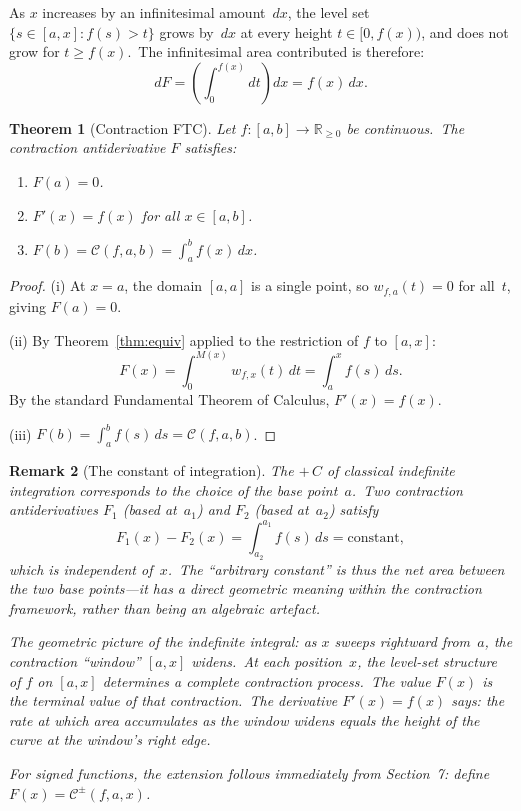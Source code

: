 \documentclass[11pt,a4paper]{article}
\newtheorem{theorem}{Theorem}[section]
\newtheorem{remark}[theorem]{Remark}
\begin{document}
As $x$ increases by an infinitesimal amount~$dx$, the level set $\{s\in[a,x]:f(s)>t\}$ grows by~$dx$ at every height $t\in[0,f(x))$, and does not grow for $t\geq f(x)$.\ The infinitesimal area contributed is therefore:
\[
dF = \left(\int_0^{f(x)}dt\right)dx = f(x)\,dx.
\]

\begin{theorem}[Contraction FTC]\label{thm:contraction-ftc}
Let $f:[a,b]\to\mathbb{R}_{\geq 0}$ be continuous.\ The contraction antiderivative $F$ satisfies:
\begin{enumerate}[label=(\roman*)]
\item $F(a) = 0$.
\item $F'(x) = f(x)$ for all $x\in[a,b]$.
\item $F(b) = \mathcal{C}(f,a,b) = \int_a^b f(x)\,dx$.
\end{enumerate}
\end{theorem}

\begin{proof}
(i) At $x=a$, the domain $[a,a]$ is a single point, so $w_{f,a}(t)=0$ for all~$t$, giving $F(a)=0$.

(ii) By Theorem~\ref{thm:equiv} applied to the restriction of $f$ to $[a,x]$:
\[
F(x) = \int_0^{M(x)}w_{f,x}(t)\,dt = \int_a^x f(s)\,ds.
\]
By the standard Fundamental Theorem of Calculus, $F'(x)=f(x)$.

(iii) $F(b)=\int_a^b f(s)\,ds = \mathcal{C}(f,a,b)$.
\end{proof}

\begin{remark}[The constant of integration]\label{rem:constant}
The $+\,C$ of classical indefinite integration corresponds to the choice of the base point~$a$.\ Two contraction antiderivatives $F_1$ (based at~$a_1$) and $F_2$ (based at~$a_2$) satisfy
\[
F_1(x) - F_2(x) = \int_{a_2}^{a_1} f(s)\,ds = \text{constant},
\]
which is independent of~$x$.\ The ``arbitrary constant'' is thus the net area between the two base points---it has a direct geometric meaning within the contraction framework, rather than being an algebraic artefact.

The geometric picture of the indefinite integral: as $x$ sweeps rightward from~$a$, the contraction ``window'' $[a,x]$ widens.\ At each position~$x$, the level-set structure of $f$ on $[a,x]$ determines a complete contraction process.\ The value $F(x)$ is the terminal value of that contraction.\ The derivative $F'(x)=f(x)$ says: the rate at which area accumulates as the window widens equals the height of the curve at the window's right edge.

For signed functions, the extension follows immediately from Section~7: define $F(x)=\mathcal{C}^{\pm}(f,a,x)$.
\end{remark}
\end{document}
